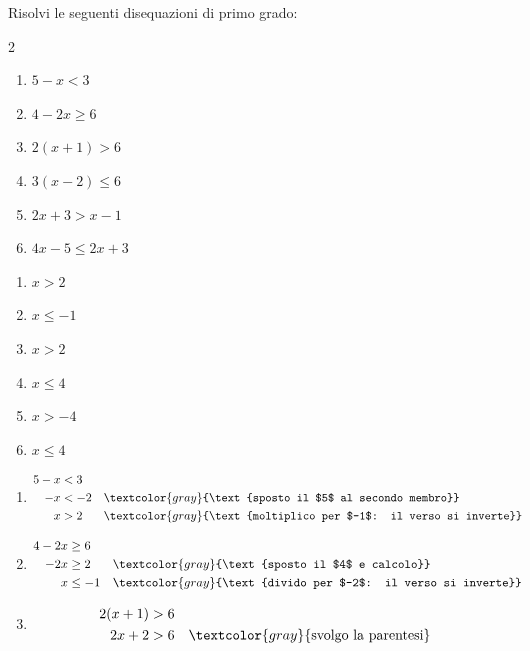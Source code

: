 \begin{question}[ID=1.2, subtitle={Disequazioni di primo grado}, difficulty=facile, tags={disequazioni lineari}]
Risolvi le seguenti disequazioni di primo grado:
\begin{multicols}{2}
\begin{enumerate}[leftmargin=3.2cm]
    \item $5 - x < 3$
    \item $4 - 2x \geq 6$
    \item $2(x + 1) > 6$
    \item $3(x - 2) \leq 6$
    \item $2x + 3 > x - 1$
    \item $4x - 5 \leq 2x + 3$
\end{enumerate}
\end{multicols}
\begin{solution}
\begin{enumerate}
    \item $x>2$
    \item $x\leq -1$
    \item $x>2$
    \item $x\leq 4$
    \item $x>-4$
    \item $x\leq 4$
\end{enumerate}
\end{solution}
\begin{explanation}
\begin{enumerate}
    \item \[\begin{aligned}
    5-x &< 3\\
    -x &< -2 && \textcolor{gray}{\text{sposto il $5$ al secondo membro}}\\
    x &> 2 && \textcolor{gray}{\text{moltiplico per $-1$: il verso si inverte}}
    \end{aligned}\]
    \item \[\begin{aligned}
    4-2x &\geq 6\\
    -2x &\geq 2 && \textcolor{gray}{\text{sposto il $4$ e calcolo}}\\
    x &\leq -1 && \textcolor{gray}{\text{divido per $-2$: il verso si inverte}}
    \end{aligned}\]
    \item \[\begin{aligned}
    2(x+1) &> 6\\
    2x+2 &> 6 && \textcolor{gray}{\text{svolgo la parentesi}}\\

\end{aligned}\]
\end{enumerate}
\end{explanation}
\end{question}
